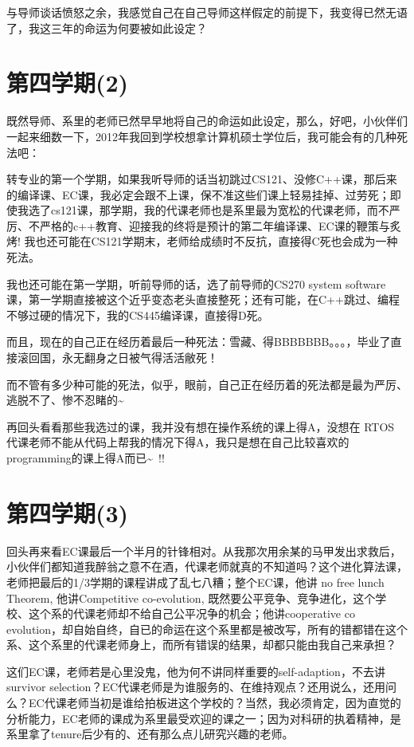\documentclass[12pt]{book}
\begin{document}
与导师谈话愤怒之余，我感觉自己在自己导师这样假定的前提下，我变得已然无语了，我这三年的命运为何要被如此设定？

\section{第四学期(2)}
\label{sec-45-2}

既然导师、系里的老师已然早早地将自己的命运如此设定，那么，好吧，小伙伴们一起来细数一下，2012年我回到学校想拿计算机硕士学位后，我可能会有的几种死法吧：

转专业的第一个学期，如果我听导师的话当初跳过CS121、没修C++课，那后来的编译课、EC课，我必定会跟不上课，保不准这些们课上轻易挂掉、过劳死；即使我选了cs121课，那学期，我的代课老师也是系里最为宽松的代课老师，而不严厉、不严格的c++教育、迎接我的终将是预计的第二年编译课、EC课的鞭策与炙烤! 我也还可能在CS121学期末，老师给成绩时不反抗，直接得C死也会成为一种死法。

我也还可能在第一学期，听前导师的话，选了前导师的CS270 system software课，第一学期直接被这个近乎变态老头直接整死；还有可能，在C++跳过、编程不够过硬的情况下，我的CS445编译课，直接得D死。

而且，现在的自己正在经历着最后一种死法：雪藏、得BBBBBBB。。。，毕业了直接滚回国，永无翻身之日被气得活活敝死！

而不管有多少种可能的死法，似乎，眼前，自己正在经历着的死法都是最为严厉、逃脱不了、惨不忍睹的\textasciitilde{}~

再回头看看那些我选过的课，我并没有想在操作系统的课上得A，没想在 RTOS 代课老师不能从代码上帮我的情况下得A，我只是想在自己比较喜欢的programming的课上得A而已\textasciitilde{}~!! 

\section{第四学期(3)}
\label{sec-45-3}

回头再来看EC课最后一个半月的针锋相对。从我那次用余某的马甲发出求救后，小伙伴们都知道我醉翁之意不在酒，代课老师就真的不知道吗？这个进化算法课，老师把最后的1/3学期的课程讲成了乱七八糟；整个EC课，他讲 no free lunch Theorem, 他讲Competitive co-evolution, 既然要公平竞争、竞争进化，这个学校、这个系的代课老师却不给自己公平况争的机会；他讲cooperative co evolution，却自始自终，自已的命运在这个系里都是被改写，所有的错都错在这个系、这个系里的代课老师身上，而所有错误的结果，却都只能由我自己来承担？

这们EC课，老师若是心里没鬼，他为何不讲同样重要的self-adaption，不去讲survivor selection？EC代课老师是为谁服务的、在维持观点？还用说么，还用问么？EC代课老师当初是谁给拍板进这个学校的？当然，我必须肯定，因为直觉的分析能力，EC老师的课成为系里最受欢迎的课之一；因为对科研的执着精神，是系里拿了tenure后少有的、还有那么点儿研究兴趣的老师。
\end{document}
